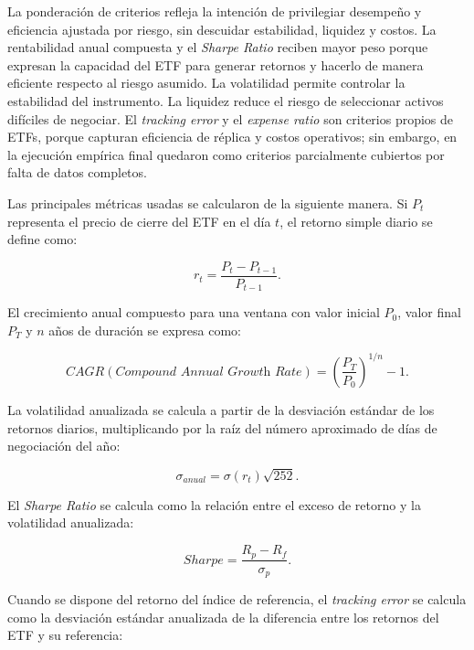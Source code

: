 \documentclass[12pt,letterpaper]{article}
\begin{document}
La ponderación de criterios refleja la intención de privilegiar desempeño y eficiencia ajustada por riesgo, sin descuidar estabilidad, liquidez y costos. La rentabilidad anual compuesta y el \textit{Sharpe Ratio} reciben mayor peso porque expresan la capacidad del ETF para generar retornos y hacerlo de manera eficiente respecto al riesgo asumido. La volatilidad permite controlar la estabilidad del instrumento. La liquidez reduce el riesgo de seleccionar activos difíciles de negociar. El \textit{tracking error} y el \textit{expense ratio} son criterios propios de ETFs, porque capturan eficiencia de réplica y costos operativos; sin embargo, en la ejecución empírica final quedaron como criterios parcialmente cubiertos por falta de datos completos.


Las principales métricas usadas se calcularon de la siguiente manera. Si $P_t$ representa el precio de cierre del ETF en el día $t$, el retorno simple diario se define como:

\begin{equation}
r_t = \frac{P_t - P_{t-1}}{P_{t-1}}.
\label{eq:retorno_diario}
\end{equation}

El crecimiento anual compuesto para una ventana con valor inicial $P_0$, valor final $P_T$ y $n$ años de duración se expresa como:

\begin{equation}
CAGR (\textit{Compound Annual Growth Rate}) = \left(\frac{P_T}{P_0}\right)^{1/n} - 1.
\label{eq:cagr}
\end{equation}

La volatilidad anualizada se calcula a partir de la desviación estándar de los retornos diarios, multiplicando por la raíz del número aproximado de días de negociación del año:

\begin{equation}
\sigma_{anual} = \sigma(r_t)\sqrt{252}.
\label{eq:volatilidad}
\end{equation}

El \textit{Sharpe Ratio} se calcula como la relación entre el exceso de retorno y la volatilidad anualizada:

\begin{equation}
Sharpe = \frac{R_p - R_f}{\sigma_p}.
\label{eq:sharpe}
\end{equation}

Cuando se dispone del retorno del índice de referencia, el \textit{tracking error} se calcula como la desviación estándar anualizada de la diferencia entre los retornos del ETF y su referencia:
\end{document}
